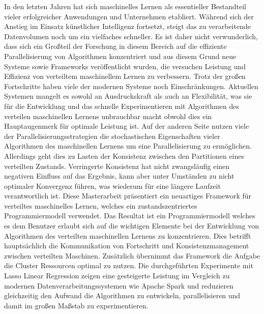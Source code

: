 % 
% 
%
\begin{abstractger}
In den letzten Jahren hat sich maschinelles Lernen als essentieller Bestandteil vieler erfolgreicher Anwendungen und Unternehmen etabliert.
W\"ahrend sich der Anstieg im Einsatz k\"unstlicher Intelligenz fortsetzt, steigt das zu verarbeitende Datenvolumen noch um ein vielfaches schneller.
Es ist daher nicht verwunderlich, dass sich ein Gro{\ss}teil der Forschung in diesem Bereich auf die effiziente Parallelisierung von Algorithmen konzentriert und aus diesem Grund neue Systeme sowie Frameworks ver\"offentlicht wurden, die versuchen Leistung und Effizienz von verteiltem maschinellem Lernen zu verbessern.
Trotz der gro{\ss}en Fortschritte haben viele der modernen Systeme noch Einschr\"ankungen.
Aktuellen Systemen mangelt es sowohl an Ausdruckskraft als auch an Flexibilit\"at, was sie f\"ur die Entwicklung und das schnelle Experimentieren mit Algorithmen des verteilen maschinellen Lernens unbrauchbar macht obwohl dies ein Hauptaugenmerk f\"ur optimale Leistung ist.
Auf der anderen Seite nutzen viele der Parallelisierungsstrategien die stochastischen Eigenschaften vieler Algorithmen des maschinellen Lernens um eine Parallelisierung zu erm\"oglichen.
Allerdings geht dies zu Lasten der Konsistenz zwischen den Partitionen eines verteilten Zustands.
Verringerte Konsistenz hat nicht zwangsl\"aufig einen negativen Einfluss auf das Ergebnis, kann aber unter Umst\"anden zu nicht optimaler Konvergenz f\"uhren, was wiederum f\"ur eine l\"angere Laufzeit verantwortlich ist.
Diese Masterarbeit pr\"asentiert ein neuartiges Framework f\"ur verteiltes maschinelles Lernen, welches ein zustandszentriertes Programmiermodell verwendet.
Das Resultat ist ein Programmiermodell welches es dem Benutzer erlaubt sich auf die wichtigen Elemente bei der Entwicklung von Algorithmen des verteilten maschinellen Lernens zu konzentrieren.
Dies betrifft haupts\"achlich die Kommunikation von Fortschritt und Konsistenzmanagement zwischen verteilten Maschinen.
Zus\"atzlich \"ubernimmt das Framework die Aufgabe die Cluster Ressourcen optimal zu nutzen.
Die durchgef\"uhrten Experimente mit Lasso Linear Regression zeigen eine gesteigerte Leistung im Vergleich zu modernen Datenverarbeitungssystemen wie Apache Spark und reduzieren gleichzeitig den Aufwand die Algorithmen zu entwickeln, parallelisieren und damit im gro{\ss}en Ma{\ss}stab zu experimentieren.
\end{abstractger}
